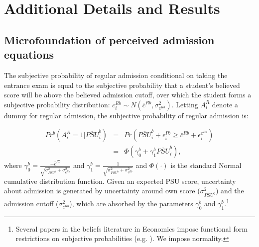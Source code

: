 \section{Additional Details and Results}\label{sec:app_add_mod}
	\setcounter{table}{0}
	\renewcommand{\thetable}{H\arabic{table}}
	
	\setcounter{figure}{0}
	\renewcommand{\thefigure}{H\arabic{figure}}
\subsection{Microfoundation of perceived admission equations}\label{sec:microfound}
The subjective probability of regular admission conditional on taking the entrance exam is equal to the subjective probability that a student's believed score will be above the believed admission cutoff, over which the student forms a subjective probability distribution: $c_i^{Rb}\sim N(\bar{c}^{Rb},\sigma^2_{c^{Rb}})$. Letting $A^R_i$ denote a dummy for regular admission, the subjective probability of regular admission is:

\vspace{-12pt}
\begin{eqnarray}\label{eq:pr_Rb}
	Pr^b(A^R_i=1|\overline{PSU}^b_{i})&=&Pr\left( \overline{PSU}^b_{i}+\epsilon_i^{Pb}\geq \bar{c}^{Rb}+\epsilon_i^{c^{Rb}} \right)\\ \nonumber
	&=&\Phi\left(\gamma_0^b +\gamma_1^b \overline{PSU}^b_{i}\right),
\end{eqnarray}
\noindent where $\gamma_0^b=\frac{-\bar{c}^{Rb}}{\sqrt{\sigma^{2}_{PSU^b}+\sigma^2_{c^{Rb}}}}$ and $\gamma_1^b=\frac{1}{\sqrt{\sigma^{2}_{PSU^b}+\sigma^2_{c^{Rb}}}}$ and $\Phi(\cdot)$ is the standard Normal cumulative distribution function. Given an expected PSU score, uncertainty about admission is generated by uncertainty around own score ($\sigma^{2}_{PSU^b}$) and the admission cutoff ($\sigma^2_{c^{Rb}}$), which are absorbed by the parameters $\gamma_0^b$ and $\gamma_1^b$.\footnote{Several papers in the beliefs literature in Economics impose functional form restrictions on subjective probabilities (e.g. \citealp{delavande2019university,kapor2020heterogeneous}). We impose normality.} \par 


